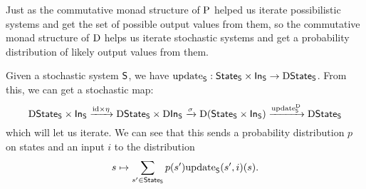 \documentclass[DynamicalBook]{subfiles}
\begin{document}
Just as the commutative monad structure of $\mathrm{P}$ helped us iterate possibilistic systems
and get the set of possible output values from them, so the commutative monad
structure of $\mathrm{D}$ helps us iterate stochastic systems and get a
probability distribution of likely output values from them.

Given a stochastic system $\mathsf{S}$, we have $\mathrm{update}_{\mathsf{S}} : \mathsf{State}_{\mathsf{S}} \times
\mathsf{In}_{\mathsf{S}} \to \mathrm{D} \mathsf{State}_{\mathsf{S}}$. From this, we can get a stochastic map:
\[
\mathrm{D}\mathsf{State}_{\mathsf{S}} \times \mathsf{In}_{\mathsf{S}} \xrightarrow{\mathrm{id} \times \eta} \mathrm{D}\mathsf{State}_{\mathsf{S}} \times
\mathrm{D}\mathsf{In}_{\mathsf{S}} \xrightarrow{\sigma} \mathrm{D}(\mathsf{State}_{\mathsf{S}} \times \mathsf{In}_{\mathsf{S}})
\xrightarrow{\mathrm{update}_{\mathsf{S}}^{\mathrm{D}}} \mathrm{D}{\mathsf{State}_{\mathsf{S}}}
\]
which will let us iterate. We can see that this sends a probability distribution
$p$ on states and an input $i$ to the distribution
\[
s \mapsto \sum_{s' \in \mathsf{State}_{\mathsf{S}}} p(s') \mathrm{update}_{\mathsf{S}}(s', i)(s).
\]
\end{document}
